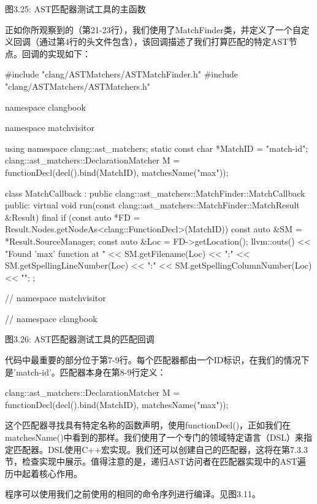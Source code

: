 \begin{center}
图3.25: AST匹配器测试工具的主函数
\end{center}

正如你所观察到的（第21-23行），我们使用了MatchFinder类，并定义了一个自定义回调（通过第4行的头文件包含），该回调描述了我们打算匹配的特定AST节点。回调的实现如下：

\begin{cpp}
#include "clang/ASTMatchers/ASTMatchFinder.h"
#include "clang/ASTMatchers/ASTMatchers.h"

namespace clangbook {
namespace matchvisitor {
using namespace clang::ast_matchers;
static const char *MatchID = "match-id";
clang::ast_matchers::DeclarationMatcher M =
  functionDecl(decl().bind(MatchID), matchesName("max"));

class MatchCallback : public clang::ast_matchers::MatchFinder::MatchCallback {
public:
  virtual void
  run(const clang::ast_matchers::MatchFinder::MatchResult &Result) final {
    if (const auto *FD = Result.Nodes.getNodeAs<clang::FunctionDecl>(MatchID)) {
       const auto &SM = *Result.SourceManager;
       const auto &Loc = FD->getLocation();
       llvm::outs() << "Found 'max' function at " << SM.getFilename(Loc) << ":"
                    << SM.getSpellingLineNumber(Loc) << ":"
                    << SM.getSpellingColumnNumber(Loc) << "\n";
    }
   }
};


} // namespace matchvisitor
} // namespace clangbook
\end{cpp}

\begin{center}
图3.26: AST匹配器测试工具的匹配回调
\end{center}

代码中最重要的部分位于第7-9行。每个匹配器都由一个ID标识，在我们的情况下是'match-id'。匹配器本身在第8-9行定义：

\begin{cpp}
clang::ast_matchers::DeclarationMatcher M =
  functionDecl(decl().bind(MatchID), matchesName("max"));
\end{cpp}

这个匹配器寻找具有特定名称的函数声明，使用functionDecl()，正如我们在matchesName()中看到的那样。我们使用了一个专门的领域特定语言（DSL）来指定匹配器。DSL使用C++宏实现。我们还可以创建自己的匹配器，这将在第7.3.3节，检查实现中展示。值得注意的是，递归AST访问者在匹配器实现中的AST遍历中起着核心作用。

程序可以使用我们之前使用的相同的命令序列进行编译。见图3.11。

